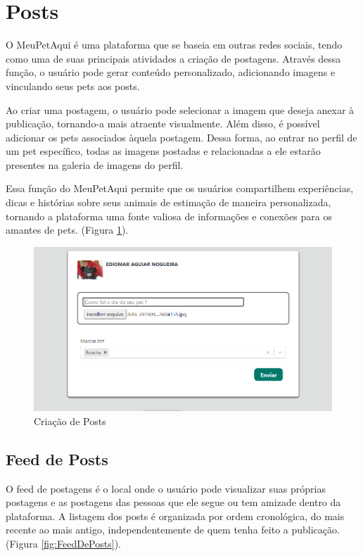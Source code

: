 \newpage

\section{Posts}
O MeuPetAqui é uma plataforma que se baseia em outras redes sociais, tendo como uma de suas principais atividades a criação de postagens. Através dessa função, o usuário pode gerar conteúdo personalizado, adicionando imagens e vinculando seus pets aos posts.

Ao criar uma postagem, o usuário pode selecionar a imagem que deseja anexar à publicação, tornando-a mais atraente visualmente. Além disso, é possível adicionar os pets associados àquela postagem. Dessa forma, ao entrar no perfil de um pet específico, todas as imagens postadas e relacionadas a ele estarão presentes na galeria de imagens do perfil.

Essa função do MeuPetAqui permite que os usuários compartilhem experiências, dicas e histórias sobre seus animais de estimação de maneira personalizada, tornando a plataforma uma fonte valiosa de informações e conexões para os amantes de pets. (Figura \ref{fig:CriaçãodePosts}).


\begin{figure}[htb]
     \centering
     \includegraphics[width=14cm]{arquivos/Figuras/image27.png}
     \caption{Criação de Posts}
     \label{fig:CriaçãodePosts}
\end{figure}

\newpage
\subsection{Feed de Posts}
\label{subsec:FeedPosts}
O feed de postagens é o local onde o usuário pode visualizar suas próprias postagens e as postagens das pessoas que ele segue ou tem amizade dentro da plataforma. A listagem dos posts é organizada por ordem cronológica, do mais recente ao mais antigo, independentemente de quem tenha feito a publicação. (Figura \ref{fig:FeedDePosts}).

